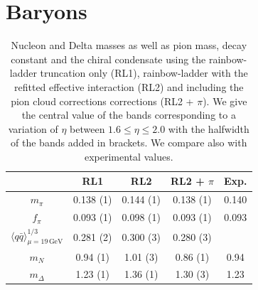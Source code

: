 \section{Baryons}
\label{sec:results}

\begin{table}[t]
 \begin{center}
 \small
\renewcommand{\arraystretch}{1.2}
  \begin{tabular}[h]{|c||c|c|c|c|}\hline
  [GeV]     &  RL1     & RL2      & RL2 + $\pi$ & Exp. \\ \hline\hline
 $m_\pi$  	& 0.138 (1)& 0.144 (1)& 0.138 (1)   & 0.140\\ \hline
 $f_\pi$  	& 0.093 (1)& 0.098 (1)& 0.093 (1)   & 0.093\\ \hline
 $\langle q\bar{q}\rangle^{1/3}_{\mu=19 \,\text{GeV}}$
          	& 0.281 (2)& 0.300 (3)& 0.280 (3)    &      \\ \hline\hline
 $m_N$      & 0.94 (1) & 1.01 (3) & 0.86 (1)    & 0.94 \\ \hline
 $m_\Delta$ & 1.23 (1) & 1.36 (1) & 1.30 (3)    & 1.23 \\ \hline
\end{tabular}
\caption{Nucleon and Delta masses as well as pion mass, decay constant and the chiral condensate 
using the rainbow-ladder truncation only (RL1),
rainbow-ladder with the refitted effective interaction (RL2) and including the pion 
cloud corrections corrections (RL2 + $\pi$). 
We give the central value of the bands corresponding to a variation of 
$\eta$ between $1.6 \le \eta \le 2.0$ with the halfwidth of the bands added in brackets. 
We compare also with experimental values.\label{tab:masses}}
 \end{center}
\end{table}

